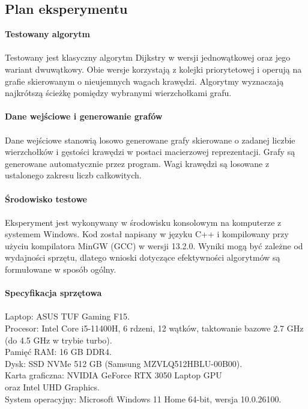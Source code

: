 \documentclass[a4paper,12pt]{article}
\begin{document}
        \subsection{Plan eksperymentu}
            \vspace{1em}
        	\textbf{Testowany algorytm}\\
            \vspace{-1.0em}\\
            Testowany jest klasyczny algorytm Dijkstry w wersji jednowątkowej oraz jego wariant dwuwątkowy. Obie wersje korzystają z kolejki priorytetowej i operują na grafie skierowanym o nieujemnych wagach krawędzi. Algorytmy wyznaczają najkrótszą ścieżkę pomiędzy wybranymi wierzchołkami grafu.\\
            \vspace{0.5em}\\
        	\textbf{Dane wejściowe i generowanie grafów}\\
            \vspace{-1.0em}\\
            Dane wejściowe stanowią losowo generowane grafy skierowane o zadanej liczbie wierzchołków i gęstości krawędzi w postaci macierzowej reprezentacji. Grafy są generowane automatycznie przez program. Wagi krawędzi są losowane z ustalonego zakresu liczb całkowitych.\\
            \vspace{0.5em}\\
        	\textbf{Środowisko testowe}\\
            \vspace{-0.5em}\\
            Eksperyment jest wykonywany w środowisku konsolowym na komputerze z systemem Windows. Kod został napisany w języku C++ i kompilowany przy użyciu kompilatora MinGW (GCC) w wersji 13.2.0. Wyniki mogą być zależne od wydajności sprzętu, dlatego wnioski dotyczące efektywności algorytmów są formułowane w sposób ogólny.\\
            \vspace{1em}\\
        	\textbf{Specyfikacja sprzętowa}\\
            \vspace{-0.5em}\\
            Laptop: ASUS TUF Gaming F15.\\
            Procesor: Intel Core i5-11400H, 6 rdzeni, 12 wątków, taktowanie bazowe 2.7 GHz (do 4.5 GHz w trybie turbo).\\
            Pamięć RAM: 16 GB DDR4.\\
            Dysk: SSD NVMe 512 GB (Samsung MZVLQ512HBLU-00B00).\\
            Karta graficzna: NVIDIA GeForce RTX 3050 Laptop GPU\\oraz Intel UHD Graphics.\\
            System operacyjny: Microsoft Windows 11 Home 64-bit, wersja 10.0.26100.
        \newpage
        \vspace*{2em}
\end{document}
